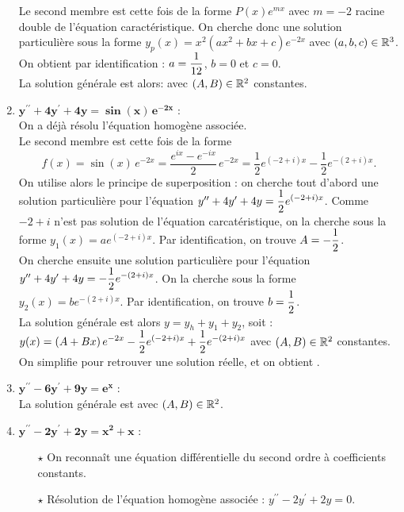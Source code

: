 \documentclass[a4paper, 11pt,reqno]{article}
\begin{document}
\begin{correction}
\begin{enumerate}
Le second membre est cette fois de la forme $P(x) e^{mx}$ avec $m=-2$ racine double de l'\'equation caract\'eristique. On cherche donc une solution particuli\`ere sous  la forme $y_p(x)=x^2(ax^2+bx+c)e^{-2x}$ avec $(a,b,c)\in\mathbb{R}^3$. On obtient par identification : $a=\displaystyle \frac{1}{12}$, $b=0$ et $c=0$.\\
La solution g\'en\'erale est alors:  avec $(A,B)\in\mathbb{R}^2$ constantes.
\item $\mathbf{y^{\prime\prime}+4y^{\prime}+4y=\sin(x) \, e^{-2x}}$ :\\
On a d\'ej\`a r\'esolu l'\'equation homog\`ene associ\'ee.\\
Le second membre est cette fois de la forme 
$$f(x)=\sin (x) \, e^{-2x} = \frac{e^{ix}-e^{-ix}}{2} \, e^{-2x} = \frac{1}{2} e^{(-2+i)x} - \frac{1}{2} e^{-(2+i)x}.$$
On utilise alors le principe de superposition : on cherche tout d'abord une solution particuli\`ere pour l'\'equation $y^{\prime\prime}+4y^{\prime}+4y=\displaystyle \frac{1}{2} e^{(-2+i)x}$. Comme $-2+i$ n'est pas solution de l'\'equation carcat\'eristique, on la cherche sous la forme $y_1(x) = a e^{(-2+i)x}$. Par identification, on trouve $A = -\displaystyle \frac{1}{2}$.\\
On cherche ensuite une solution particuli\`ere pour l'\'equation $y^{\prime\prime}+4y^{\prime}+4y=\displaystyle -\frac{1}{2} e^{-(2+i)x}$. On la cherche sous la forme $y_2(x) = b e^{-(2+i)x}$. Par identification, on trouve $b = \displaystyle \displaystyle \frac{1}{2}$.\\
La solution g\'en\'erale est alors $y=y_h+y_1+y_2$, soit : $y(x) = \displaystyle  \left(A +B x \right)e^{-2x} - \frac{1}{2} e^{(-2+i)x} + \displaystyle \frac{1}{2} e^{-(2+i)x}$ avec $(A,B)\in\mathbb{R}^2$ constantes. On simplifie pour retrouver une solution r\'eelle, et on obtient .
\item $\mathbf{y^{\prime\prime}-6y^{\prime}+9y=e^x}$ :\\
La solution g\'en\'erale  est  avec $(A,B)\in\mathbb{R}^2$.
\item $\mathbf{y^{\prime\prime}-2y^{\prime}+2y=x^2+x}$ :\\
\begin{itemize}
\item[$\star$] On reconna\^{i}t une \'equation diff\'erentielle du second ordre \`{a} coefficients constants.
\item[$\star$] R\'esolution de l'\'equation homog\`ene associ\'ee : $y^{\prime\prime}-2y^{\prime}+2y=0$.\\

\end{itemize}
\end{enumerate}
\end{correction}
\end{document}
